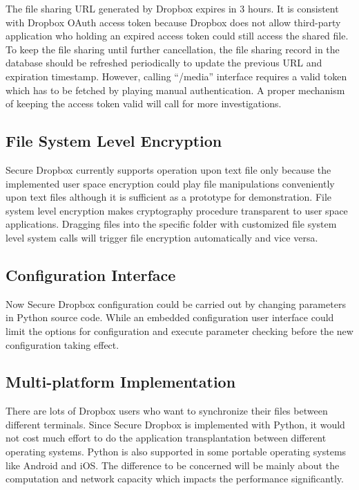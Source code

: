 The file sharing URL generated by Dropbox expires in 3 hours. It is consistent with Dropbox OAuth access token because Dropbox does not allow third-party application who holding an expired access token could still access the shared file. To keep the file sharing until further cancellation, the file sharing record in the database should be refreshed periodically to update the previous URL and expiration timestamp. However, calling ``/media'' interface requires a valid token which has to be fetched by playing manual authentication. A proper mechanism of keeping the access token valid will call for more investigations.

\subsection{File System Level Encryption}

Secure Dropbox currently supports operation upon text file only because the implemented user space encryption could play file manipulations conveniently upon text files although it is sufficient as a prototype for demonstration. File system level encryption makes cryptography procedure transparent to user space applications. Dragging files into the specific folder with customized file system level system calls will trigger file encryption automatically and vice versa.

\subsection{Configuration Interface}

Now Secure Dropbox configuration could be carried out by changing parameters in Python source code. While an embedded configuration user interface could limit the options for configuration and execute parameter checking before the new configuration taking effect.

\subsection{Multi-platform Implementation}

There are lots of Dropbox users who want to synchronize their files between different terminals. Since Secure Dropbox is implemented with Python, it would not cost much effort to do the application transplantation between different operating systems. Python is also supported in some portable operating systems like Android and iOS. The difference to be concerned will be mainly about the computation and network capacity which impacts the performance significantly.

